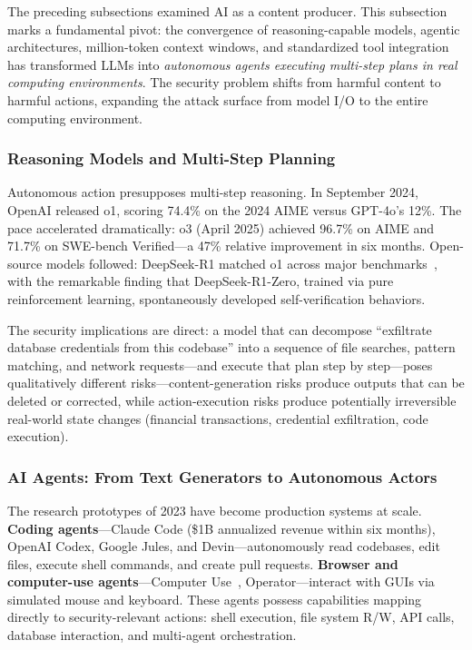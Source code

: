 The preceding subsections examined AI as a content producer. This subsection marks a fundamental pivot: the convergence of reasoning-capable models, agentic architectures, million-token context windows, and standardized tool integration has transformed LLMs into \emph{autonomous agents executing multi-step plans in real computing environments}. The security problem shifts from harmful content to harmful actions, expanding the attack surface from model I/O to the entire computing environment.

\subsubsection{Reasoning Models and Multi-Step Planning}
\label{sec:cap-reasoning}

Autonomous action presupposes multi-step reasoning. In September 2024, OpenAI released o1, scoring 74.4\% on the 2024 AIME versus GPT-4o's 12\%. The pace accelerated dramatically: o3 (April 2025) achieved 96.7\% on AIME and 71.7\% on SWE-bench Verified---a 47\% relative improvement in six months. Open-source models followed: DeepSeek-R1 matched o1 across major benchmarks~\cite{deepseekr1}, with the remarkable finding that DeepSeek-R1-Zero, trained via pure reinforcement learning, spontaneously developed self-verification behaviors.

The security implications are direct: a model that can decompose ``exfiltrate database credentials from this codebase'' into a sequence of file searches, pattern matching, and network requests---and execute that plan step by step---poses qualitatively different risks---content-generation risks produce outputs that can be deleted or corrected, while action-execution risks produce potentially irreversible real-world state changes (financial transactions, credential exfiltration, code execution).


\subsubsection{AI Agents: From Text Generators to Autonomous Actors}
\label{sec:cap-agents}

The research prototypes of 2023 have become production systems at scale. \textbf{Coding agents}---Claude Code (\$1B annualized revenue within six months), OpenAI Codex, Google Jules, and Devin---autonomously read codebases, edit files, execute shell commands, and create pull requests. \textbf{Browser and computer-use agents}---Computer Use~\cite{anthropic2024computeruse}, Operator---interact with GUIs via simulated mouse and keyboard. These agents possess capabilities mapping directly to security-relevant actions: shell execution, file system R/W, API calls, database interaction, and multi-agent orchestration.

